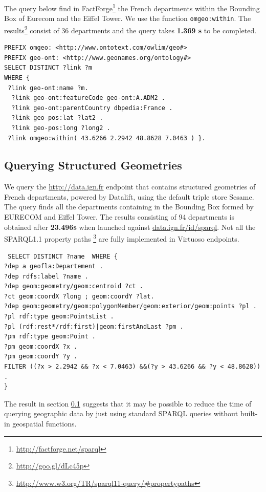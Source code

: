 The query below find in FactForge\footnote{\url{http://factforge.net/sparql}} the French departments within the Bounding Box of Eurecom and the Eiffel Tower. We use the function \texttt{omgeo:within}. The results\footnote{\url{http://goo.gl/dLc45p}} consist of 36 departments and the query takes \textbf{1.369 s} to be completed.
\begin{verbatim}
PREFIX omgeo: <http://www.ontotext.com/owlim/geo#>
PREFIX geo-ont: <http://www.geonames.org/ontology#>
SELECT DISTINCT ?link ?m
WHERE {
 ?link geo-ont:name ?m.
  ?link geo-ont:featureCode geo-ont:A.ADM2 .
  ?link geo-ont:parentCountry dbpedia:France .
  ?link geo-pos:lat ?lat2 .
  ?link geo-pos:long ?long2 .
 ?link omgeo:within( 43.6266 2.2942 48.8628 7.0463 ) }.

\end{verbatim}


\subsection{Querying Structured Geometries}
\label{sec:ignsparql}
We query the \url{http://data.ign.fr} endpoint that contains structured geometries of French departments, powered by Datalift, using the default triple store Sesame. The query finds all the departments containing in the Bounding Box formed by EURECOM and Eiffel Tower. The results consisting of 94 departments is obtained after \textbf{23.496s} when launched against \url{data.ign.fr/id/sparql}. Not all the SPARQL1.1 property paths \footnote{\url{http://www.w3.org/TR/sparql11-query/\#propertypaths}} are fully implemented in Virtuoso endpoints.

\begin{verbatim}
 SELECT DISTINCT ?name  WHERE {
?dep a geofla:Departement .
?dep rdfs:label ?name .
?dep geom:geometry/geom:centroid ?ct .
?ct geom:coordX ?long ; geom:coordY ?lat.
?dep geom:geometry/geom:polygonMember/geom:exterior/geom:points ?pl .
?pl rdf:type geom:PointsList .
?pl (rdf:rest*/rdf:first)|geom:firstAndLast ?pm .
?pm rdf:type geom:Point .
?pm geom:coordX ?x .
?pm geom:coordY ?y .
FILTER ((?x > 2.2942 && ?x < 7.0463) &&(?y > 43.6266 && ?y < 48.8628)) .
}
\end{verbatim}

The result in section \ref{sec:ignsparql} suggests that it may be possible to reduce the time of querying geographic data by just using standard SPARQL queries without built-in geospatial functions.


